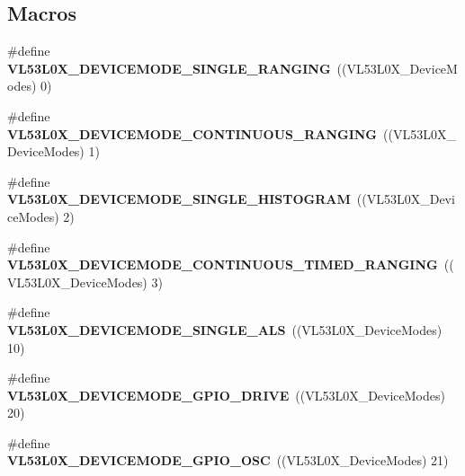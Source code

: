 \subsection*{Macros}
\begin{DoxyCompactItemize}
\item 
\mbox{\label{group__VL53L0X__define__DeviceModes__group_ga00e5de94c87b8ebe96347539e8da521b}} 
\#define {\bfseries V\+L53\+L0\+X\+\_\+\+D\+E\+V\+I\+C\+E\+M\+O\+D\+E\+\_\+\+S\+I\+N\+G\+L\+E\+\_\+\+R\+A\+N\+G\+I\+NG}~((V\+L53\+L0\+X\+\_\+\+Device\+Modes)  0)
\item 
\mbox{\label{group__VL53L0X__define__DeviceModes__group_ga120c46888d1192a4f2dc146c4519b381}} 
\#define {\bfseries V\+L53\+L0\+X\+\_\+\+D\+E\+V\+I\+C\+E\+M\+O\+D\+E\+\_\+\+C\+O\+N\+T\+I\+N\+U\+O\+U\+S\+\_\+\+R\+A\+N\+G\+I\+NG}~((V\+L53\+L0\+X\+\_\+\+Device\+Modes)  1)
\item 
\mbox{\label{group__VL53L0X__define__DeviceModes__group_ga99363cd30b5ea4be01118d11f8fd5456}} 
\#define {\bfseries V\+L53\+L0\+X\+\_\+\+D\+E\+V\+I\+C\+E\+M\+O\+D\+E\+\_\+\+S\+I\+N\+G\+L\+E\+\_\+\+H\+I\+S\+T\+O\+G\+R\+AM}~((V\+L53\+L0\+X\+\_\+\+Device\+Modes)  2)
\item 
\mbox{\label{group__VL53L0X__define__DeviceModes__group_gae2b355c47714ed7fbac23de6d4c059dd}} 
\#define {\bfseries V\+L53\+L0\+X\+\_\+\+D\+E\+V\+I\+C\+E\+M\+O\+D\+E\+\_\+\+C\+O\+N\+T\+I\+N\+U\+O\+U\+S\+\_\+\+T\+I\+M\+E\+D\+\_\+\+R\+A\+N\+G\+I\+NG}~((V\+L53\+L0\+X\+\_\+\+Device\+Modes) 3)
\item 
\mbox{\label{group__VL53L0X__define__DeviceModes__group_ga3b112b695737e4a341a767e45a13c962}} 
\#define {\bfseries V\+L53\+L0\+X\+\_\+\+D\+E\+V\+I\+C\+E\+M\+O\+D\+E\+\_\+\+S\+I\+N\+G\+L\+E\+\_\+\+A\+LS}~((V\+L53\+L0\+X\+\_\+\+Device\+Modes) 10)
\item 
\mbox{\label{group__VL53L0X__define__DeviceModes__group_ga1a4159e841975415b4938165533012bb}} 
\#define {\bfseries V\+L53\+L0\+X\+\_\+\+D\+E\+V\+I\+C\+E\+M\+O\+D\+E\+\_\+\+G\+P\+I\+O\+\_\+\+D\+R\+I\+VE}~((V\+L53\+L0\+X\+\_\+\+Device\+Modes) 20)
\item 
\mbox{\label{group__VL53L0X__define__DeviceModes__group_ga65c383b38533235fcad65e5057ade145}} 
\#define {\bfseries V\+L53\+L0\+X\+\_\+\+D\+E\+V\+I\+C\+E\+M\+O\+D\+E\+\_\+\+G\+P\+I\+O\+\_\+\+O\+SC}~((V\+L53\+L0\+X\+\_\+\+Device\+Modes) 21)
\end{DoxyCompactItemize}
